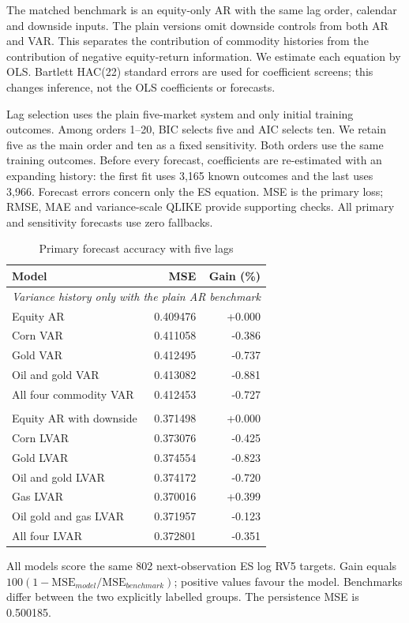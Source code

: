 \documentclass[11pt,letterpaper]{article}
\begin{document}
The matched benchmark is an equity-only AR with the same lag order, calendar and
downside inputs. The plain versions omit downside controls from both AR and VAR.
This separates the contribution of commodity histories from the contribution of
negative equity-return information. We estimate each equation by OLS. Bartlett
HAC(22) standard errors are used for coefficient screens; this changes inference,
not the OLS coefficients or forecasts.

Lag selection uses the plain five-market system and only initial training outcomes.
Among orders 1--20, BIC selects five and AIC selects ten. We retain five as the main
order and ten as a fixed sensitivity. Both orders use the same training outcomes.
Before every forecast, coefficients are re-estimated with an expanding history:
the first fit uses 3,165 known outcomes and the last uses 3,966. Forecast errors concern
only the ES equation. MSE is the primary loss; RMSE, MAE and variance-scale QLIKE
provide supporting checks. All primary and sensitivity forecasts use zero fallbacks.

\begin{table}[H]
\centering
\caption{Primary forecast accuracy with five lags}\label{tab:primary}
\small
\begin{tabular}{p{3.85in}rr}
\toprule
Model & MSE & Gain (\%) \\
\midrule
\multicolumn{3}{l}{\textit{Variance history only with the plain AR benchmark}} \\
Equity AR & 0.409476 & +0.000 \\
Corn VAR & 0.411058 & -0.386 \\
Gold VAR & 0.412495 & -0.737 \\
Oil and gold VAR & 0.413082 & -0.881 \\
All four commodity VAR & 0.412453 & -0.727 \\
\addlinespace\multicolumn{3}{l}{\textit{Downside information with the downside AR benchmark}} \\
Equity AR with downside & 0.371498 & +0.000 \\
Corn LVAR & 0.373076 & -0.425 \\
Gold LVAR & 0.374554 & -0.823 \\
Oil and gold LVAR & 0.374172 & -0.720 \\
Gas LVAR & 0.370016 & +0.399 \\
Oil gold and gas LVAR & 0.371957 & -0.123 \\
All four LVAR & 0.372801 & -0.351 \\
\bottomrule
\end{tabular}
\end{table}
{\footnotesize All models score the same 802 next-observation ES log RV5 targets. Gain equals $100(1-\mathrm{MSE}_{model}/\mathrm{MSE}_{benchmark})$; positive values favour the model. Benchmarks differ between the two explicitly labelled groups. The persistence MSE is 0.500185.\par}
\end{document}

